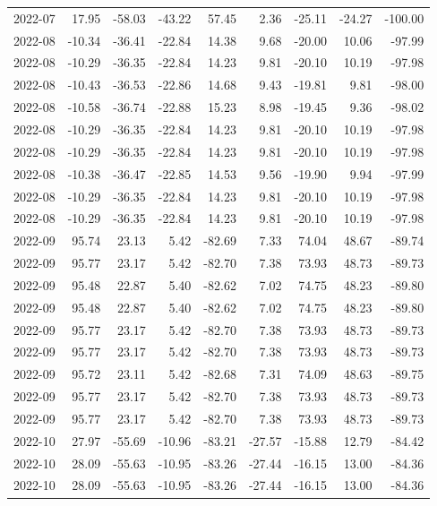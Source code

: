 \begin{table}[ht]
\begin{tabular}{lrrrrrrrr}
  2022-07 & 17.95 & -58.03 & -43.22 & 57.45 & 2.36 & -25.11 & -24.27 & -100.00 \\ 
  2022-08 & -10.34 & -36.41 & -22.84 & 14.38 & 9.68 & -20.00 & 10.06 & -97.99 \\ 
  2022-08 & -10.29 & -36.35 & -22.84 & 14.23 & 9.81 & -20.10 & 10.19 & -97.98 \\ 
  2022-08 & -10.43 & -36.53 & -22.86 & 14.68 & 9.43 & -19.81 & 9.81 & -98.00 \\ 
  2022-08 & -10.58 & -36.74 & -22.88 & 15.23 & 8.98 & -19.45 & 9.36 & -98.02 \\ 
  2022-08 & -10.29 & -36.35 & -22.84 & 14.23 & 9.81 & -20.10 & 10.19 & -97.98 \\ 
  2022-08 & -10.29 & -36.35 & -22.84 & 14.23 & 9.81 & -20.10 & 10.19 & -97.98 \\ 
  2022-08 & -10.38 & -36.47 & -22.85 & 14.53 & 9.56 & -19.90 & 9.94 & -97.99 \\ 
  2022-08 & -10.29 & -36.35 & -22.84 & 14.23 & 9.81 & -20.10 & 10.19 & -97.98 \\ 
  2022-08 & -10.29 & -36.35 & -22.84 & 14.23 & 9.81 & -20.10 & 10.19 & -97.98 \\ 
  2022-09 & 95.74 & 23.13 & 5.42 & -82.69 & 7.33 & 74.04 & 48.67 & -89.74 \\ 
  2022-09 & 95.77 & 23.17 & 5.42 & -82.70 & 7.38 & 73.93 & 48.73 & -89.73 \\ 
  2022-09 & 95.48 & 22.87 & 5.40 & -82.62 & 7.02 & 74.75 & 48.23 & -89.80 \\ 
  2022-09 & 95.48 & 22.87 & 5.40 & -82.62 & 7.02 & 74.75 & 48.23 & -89.80 \\ 
  2022-09 & 95.77 & 23.17 & 5.42 & -82.70 & 7.38 & 73.93 & 48.73 & -89.73 \\ 
  2022-09 & 95.77 & 23.17 & 5.42 & -82.70 & 7.38 & 73.93 & 48.73 & -89.73 \\ 
  2022-09 & 95.72 & 23.11 & 5.42 & -82.68 & 7.31 & 74.09 & 48.63 & -89.75 \\ 
  2022-09 & 95.77 & 23.17 & 5.42 & -82.70 & 7.38 & 73.93 & 48.73 & -89.73 \\ 
  2022-09 & 95.77 & 23.17 & 5.42 & -82.70 & 7.38 & 73.93 & 48.73 & -89.73 \\ 
  2022-10 & 27.97 & -55.69 & -10.96 & -83.21 & -27.57 & -15.88 & 12.79 & -84.42 \\ 
  2022-10 & 28.09 & -55.63 & -10.95 & -83.26 & -27.44 & -16.15 & 13.00 & -84.36 \\ 
  2022-10 & 28.09 & -55.63 & -10.95 & -83.26 & -27.44 & -16.15 & 13.00 & -84.36 \\ 

\end{tabular}
\end{table}
